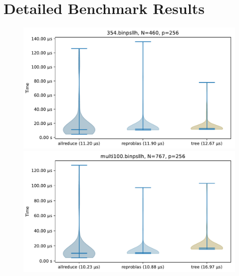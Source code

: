 \section{Detailed Benchmark Results}

\newcommand{\mScale}{0.7}
\begin{figure}[H]\centering
\includegraphics[scale=\mScale]{figures/violin354.pdf}
\includegraphics[scale=\mScale]{figures/violinMulti100.pdf}

\end{figure}
